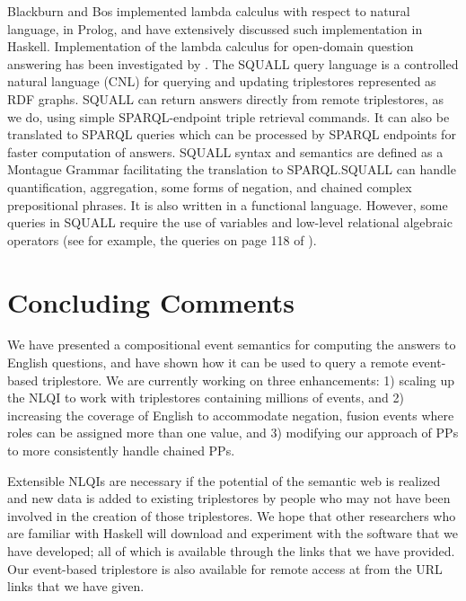 \documentclass[../main.tex]{subfiles}
\begin{document}
\begin{refsection}
Blackburn and Bos \cite{blackburn2005representation} implemented lambda calculus with respect to natural language, in
Prolog, and \cite{van2010computational} have extensively discussed such implementation in
Haskell. Implementation of the lambda calculus for open-domain question answering has been
investigated by \cite{ahn2005question}.
The SQUALL query language \cite{ferre:squall,ferre2013squall} is a controlled natural language
(CNL) for querying and updating triplestores represented as RDF graphs. SQUALL can return
answers directly from remote triplestores, as we do, using simple SPARQL-endpoint triple
retrieval commands. It can also be translated to SPARQL queries which can be processed by
SPARQL endpoints for faster computation of answers. SQUALL syntax and semantics are
defined as a Montague Grammar facilitating the translation to SPARQL.SQUALL can handle
quantification, aggregation, some forms of negation, and chained complex prepositional phrases.
It is also written in a functional language. However, some queries in SQUALL require the use of
variables and low-level relational algebraic operators (see for example, the queries on page 118
of \cite{ferre2013squall}).

\section{Concluding Comments}
\label{ext:conclusion}
We have presented a compositional event semantics for computing the answers to English questions,
and have shown how it can be used to query a remote event-based triplestore. We are currently
working on three enhancements: 1) scaling up the NLQI to work with triplestores containing millions of
events, and 2) increasing the coverage of English to accommodate negation, fusion events where roles
can be assigned more than one value, and 3) modifying our approach of PPs to more
consistently handle chained PPs.

Extensible NLQIs are necessary if the potential of the semantic web is realized and new data is added
to existing triplestores by people who may not have been involved in the creation of those triplestores.
We hope that other researchers who are familiar with Haskell will download and experiment with the
software that we have developed; all of which is available through the links that we have provided. Our
event-based triplestore is also available for remote access at from the URL
links that we have given.


\end{refsection}
\end{document}
